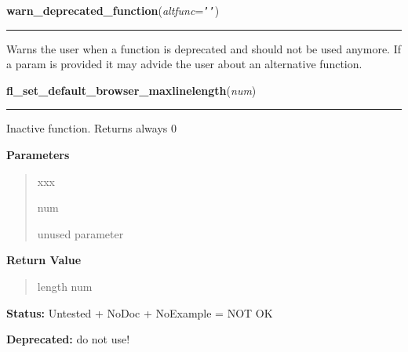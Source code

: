     \vspace{0.5ex}

\hspace{.8\funcindent}\begin{boxedminipage}{\funcwidth}

    \raggedright \textbf{warn\_deprecated\_function}(\textit{altfunc}={\tt \texttt{'}\texttt{}\texttt{'}})

    \vspace{-1.5ex}

    \rule{\textwidth}{0.5\fboxrule}
\setlength{\parskip}{2ex}
    Warns the user when a function is deprecated and should not be used 
    anymore. If a param is provided it may advide the user about an 
    alternative function.

\setlength{\parskip}{1ex}
    \end{boxedminipage}

    \label{xformslib:deprecated:fl_set_default_browser_maxlinelength}

    \vspace{0.5ex}

\hspace{.8\funcindent}\begin{boxedminipage}{\funcwidth}

    \raggedright \textbf{fl\_set\_default\_browser\_maxlinelength}(\textit{num})

    \vspace{-1.5ex}

    \rule{\textwidth}{0.5\fboxrule}
\setlength{\parskip}{2ex}
    Inactive function. Returns always 0

\setlength{\parskip}{1ex}
      \textbf{Parameters}
      \vspace{-1ex}

      \begin{quote}
        \begin{Ventry}{xxx}

          \item[num]

          unused parameter

        \end{Ventry}

      \end{quote}

      \textbf{Return Value}
    \vspace{-1ex}

      \begin{quote}
      length num

      \end{quote}

\textbf{Status:} Untested + NoDoc + NoExample = NOT OK



\textbf{Deprecated:} do not use!



    \end{boxedminipage}

